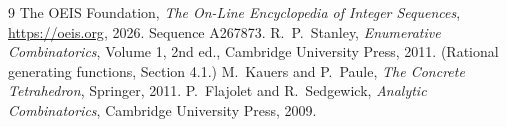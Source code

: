 \documentclass[11pt,a4paper]{article}
\theoremstyle{plain}
\theoremstyle{definition}
\begin{document}
\begin{thebibliography}{9}
 The OEIS Foundation, \emph{The On-Line Encyclopedia of Integer
Sequences}, \url{https://oeis.org}, 2026. Sequence A267873.
 R.~P.~Stanley, \emph{Enumerative Combinatorics}, Volume 1, 2nd ed.,
Cambridge University Press, 2011. (Rational generating functions, Section 4.1.)
 M.~Kauers and P.~Paule, \emph{The Concrete Tetrahedron}, Springer, 2011.
 P.~Flajolet and R.~Sedgewick, \emph{Analytic Combinatorics}, Cambridge
University Press, 2009.
\end{thebibliography}
\end{document}
